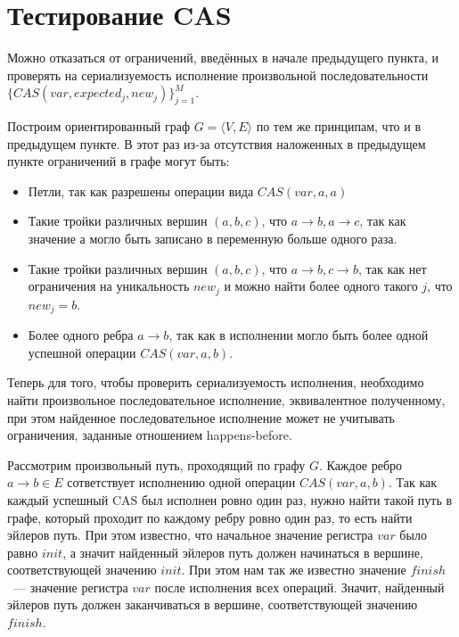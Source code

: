 \documentclass[times,specification,annotation]{itmo-student-thesis}
\begin{document}
\section{Тестирование CAS}

Можно отказаться от ограничений, введённых в начале предыдущего пункта, и проверять на сериализуемость исполнение произвольной последовательности $\{CAS(var, expected_j, new_j)\}_{j = 1}^M$.

Построим ориентированный граф $G = \langle V, E \rangle$ по тем же принципам, что и в предыдущем пункте. В этот раз из-за отсутствия наложенных в предыдущем пункте ограничений в графе могут быть:

\begin{itemize}
    \item Петли, так как разрешены операции вида $CAS(var, a, a)$
    
    \item Такие тройки различных вершин $(a, b, c)$, что $a \rightarrow b, a \rightarrow c$, так как значение $а$ могло быть записано в переменную больше одного раза.
    
    \item Такие тройки различных вершин $(a, b, c)$, что $a \rightarrow b, c \rightarrow b$, так как нет ограничения на уникальность $new_j$ и можно найти более одного такого $j$, что $new_j = b$.
    
    \item Более одного ребра $a \rightarrow b$, так как в исполнении могло быть более одной успешной операции $CAS(var, a, b)$.
\end{itemize}

\bigbreak

Теперь для того, чтобы проверить сериализуемость исполнения, необходимо найти произвольное последовательное исполнение, эквивалентное полученному, при этом найденное последовательное исполнение может не учитывать ограничения, заданные отношением happens-before.

Рассмотрим произвольный путь, проходящий по графу $G$. Каждое ребро $a \rightarrow b \in E$ сответствует исполнению одной операции $CAS(var, a, b)$. Так как каждый успешный CAS был исполнен ровно один раз, нужно найти такой путь в графе, который проходит по каждому ребру ровно один раз, то есть найти эйлеров путь. При этом известно, что начальное значение регистра $var$ было равно $init$, а значит найденный эйлеров путь должен начинаться в вершине, соответствующей значению $init$. При этом нам так же известно значение $finish$~--- значение регистра $var$ после исполнения всех операций. Значит, найденный эйлеров путь должен заканчиваться в вершине, соответствующей значению $finish$.
\end{document}
